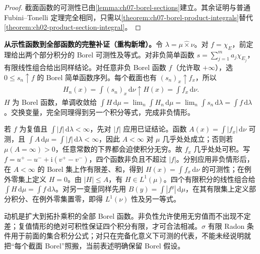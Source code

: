 \documentclass[../../main.tex]{subfiles}
\begin{document}
\begin{proof}
截面函数的可测性已由\cref{lemma:ch07-borel-sections}建立。其余证明与普通 Fubini--Tonelli 定理完全相同，只需以\cref{theorem:ch07-borel-product-integrals}替代\cref{theorem:ch02-product-section-integral}。
\end{proof}
\begin{remark}
\textbf{从示性函数到全部函数的完整补证（重构新增）。}令 $\lambda=\mu\mathbin{\widehat\times}\nu$。对 $f=\chi_E$，前定理给出两个部分积分的 Borel 可测性及等式。对非负简单函数 $s=\sum_{j=1}^ma_j\chi_{E_j}$，有限线性组合给出同样结论。对任意非负 Borel 函数 $f$（允许取 $+\infty$），选 $0\leqslant s_n\uparrow f$ 的 Borel 简单函数序列。每个截面也有 $(s_n)_x\uparrow f_x$，所以
\begin{align*}
H_n(x)=\int(s_n)_x\,\mathrm d\nu\uparrow H(x)=\int f_x\,\mathrm d\nu.
\end{align*}
$H$ 为 Borel 函数，单调收敛给 $\int H\,\mathrm d\mu=\lim_n\int H_n\,\mathrm d\mu=\lim_n\int s_n\,\mathrm d\lambda=\int f\,\mathrm d\lambda$。交换变量，完全同理得到另一个积分等式，完成非负情形。

若 $f$ 为复值且 $\int|f|\,\mathrm d\lambda<\infty$，先对 $|f|$ 应用已证结论。函数 $A(x)=\int|f_x|\,\mathrm d\nu$ 可测，且 $\int A\,\mathrm d\mu=\int|f|\,\mathrm d\lambda<\infty$，因此 $A<\infty$ 对 $\mu$ 几乎处处成立；否则若 $\mu(A=\infty)>0$，任意常数的下界都会迫使积分无穷。故 $f_x$ 几乎处处可积。写 $f=u^+-u^-+\mathrm i(v^+-v^-)$，四个函数非负且不超过 $|f|$。分别应用非负情形后，在 $A<\infty$ 的 Borel 集上作有限差、和，得到 $H(x)=\int f_x\,\mathrm d\nu$ 的可测性；在例外零集上定义 $H=0$。由 $|H|\leqslant A$，有 $H\in L^1(\mu)$。四个有限积分的线性组合给 $\int H\,\mathrm d\mu=\int f\,\mathrm d\lambda$。对另一变量同样先用 $B(y)=\int|f^y|\,\mathrm d\mu$，在其有限集上定义部分积分、在例外零集置零，即得 $L^1(\nu)$ 性及另一等式。

动机是扩大到拓扑乘积的全部 Borel 函数。非负性允许使用无穷值而不出现不定差；复值情形的绝对可积性保证四个积分有限，才可合法相减。$\sigma$ 有限 Radon 条件用于前面的集合积分公式；对只在完备化意义下可测的代表，不能未经说明就把“每个截面 Borel”照搬，当前表述明确保留 Borel 假设。
\end{remark}

\end{document}
